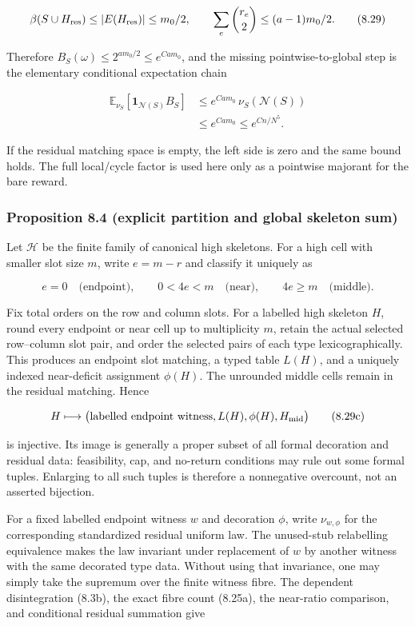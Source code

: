 \documentclass[11pt]{article}
\begin{document}
\[
 \beta(S\cup H_{\rm res})\le |E(H_{\rm res})|\le m_0/2,
 \qquad
 \sum_e\binom{r_e}{2}\le(a-1)m_0/2.
 \tag{8.29}
\]

Therefore \(B_S(\omega)\le2^{am_0/2}\le e^{Cam_0}\), and the missing pointwise-to-global step is the elementary conditional expectation chain

\[
 \begin{split}
 \mathbb E_{\nu_S}[\mathbf1_{\mathcal N(S)}B_S]
 &\le e^{Cam_0}\,\nu_S(\mathcal N(S))\\
 &\le e^{Cam_0}\le e^{Cn/N^5}.
 \end{split}
 \tag{8.29a}
\]

If the residual matching space is empty, the left side is zero and the same bound holds. The full local/cycle factor is used here only as a pointwise majorant for the bare reward.

\subsubsection{Proposition 8.4 (explicit partition and global skeleton sum)}\label{proposition-8.4-explicit-partition-and-global-skeleton-sum}

Let \(\mathcal H\) be the finite family of canonical high skeletons. For a high cell with smaller slot size \(m\), write \(e=m-r\) and classify it uniquely as

\[
 e=0\quad\text{(endpoint)},\qquad
 0<4e<m\quad\text{(near)},\qquad
 4e\ge m\quad\text{(middle)}.
 \tag{8.29b}
\]

Fix total orders on the row and column slots. For a labelled high skeleton \(H\), round every endpoint or near cell up to multiplicity \(m\), retain the actual selected row--column slot pair, and order the selected pairs of each type lexicographically. This produces an endpoint slot matching, a typed table \(L(H)\), and a uniquely indexed near-deficit assignment \(\phi(H)\). The unrounded middle cells remain in the residual matching. Hence

\[
 H\longmapsto
 \bigl(\text{labelled endpoint witness},L(H),\phi(H),H_{\rm mid}\bigr)
 \tag{8.29c}
\]

is injective. Its image is generally a proper subset of all formal decoration and residual data: feasibility, cap, and no-return conditions may rule out some formal tuples. Enlarging to all such tuples is therefore a nonnegative overcount, not an asserted bijection.

For a fixed labelled endpoint witness \(w\) and decoration \(\phi\), write \(\nu_{w,\phi}\) for the corresponding standardized residual uniform law. The unused-stub relabelling equivalence makes the law invariant under replacement of \(w\) by another witness with the same decorated type data. Without using that invariance, one may simply take the supremum over the finite witness fibre. The dependent disintegration (8.3b), the exact fibre count (8.25a), the near-ratio comparison, and conditional residual summation give
\end{document}
